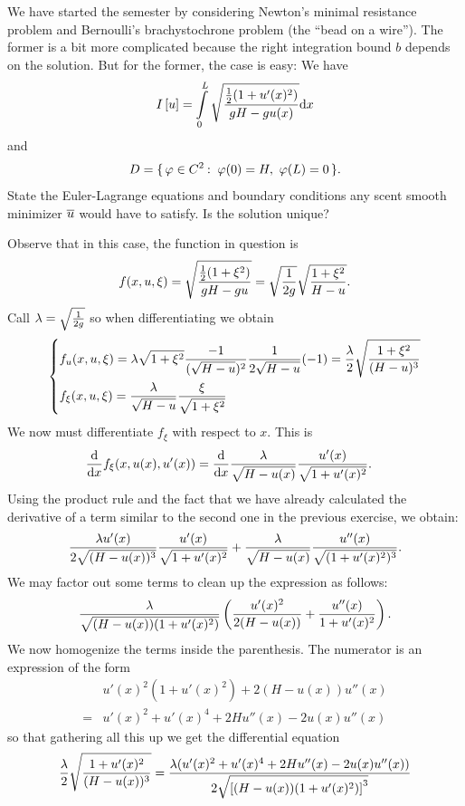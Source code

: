 \documentclass[12pt]{memoir}
\begin{document}
\begin{Ej}
    We have started the semester by considering Newton's
    minimal resistance problem and Bernoulli's brachystochrone problem (the ``bead on a wire''). The former is
    a bit more complicated because the right integration bound $ b$ depends on the solution. But for the former,
    the case is easy: We have
    $$I\bonj{u}=\int\limits_0^L\sqrt{\frac{\half(1+u'(x)^2)}{gH-gu(x)}}\dd x$$
    and
    $$D=\set{\vf\in C^2\:\ \vf(0)=H,\ \vf(L)=0}.$$
    State the Euler-Lagrange equations and boundary conditions any scent smooth minimizer $\overline u$ would
have to satisfy. Is the solution unique?
\end{Ej}

\begin{ptcbr}
Observe that in this case, the function in question is 
$$f(x,u,\xi)=\sqrt{\frac{\half(1+\xi^2)}{gH-gu}}=\sqrt{\frac{1}{2g}}\sqrt{\frac{1+\xi^2}{H-u}}.$$
Call $\lambda=\sqrt{\frac{1}{2g}}$ so when differentiating we obtain 
$$\left\lbrace
\begin{aligned}
    &f_u(x,u,\xi)=\lambda\sqrt{1+\xi^2}\frac{-1}{(\sqrt{H-u})^2}\frac{1}{2\sqrt{H-u}}(-1)=\frac{\lambda}{2}\sqrt{\frac{1+\xi^2}{(H-u)^3}}\\
    &f_\xi(x,u,\xi)=\frac{\lambda}{\sqrt{H-u}}\frac{\xi}{\sqrt{1+\xi^2}}
\end{aligned}
\right.
$$
We now must differentiate $f_\xi$ with respect to $x$. This is 
\begin{align*}
    \dv{x}f_{\xi}(x,u(x),u'(x))&=\dv{x}\frac{\lambda}{\sqrt{H-u(x)}}\frac{u'(x)}{\sqrt{1+u'(x)^2}}.
\end{align*}
Using the product rule and the fact that we have already calculated the derivative of a term similar to the second one in the previous exercise, we obtain:
$$\frac{\lambda u'(x)}{2\sqrt{(H-u(x))^3}}\frac{u'(x)}{\sqrt{1+u'(x)^2}}+\frac{\lambda}{\sqrt{H-u(x)}}\frac{u''(x)}{\sqrt{(1+u'(x)^2)^{3}}}.$$
We may factor out some terms to clean up the expression as follows:
$$\frac{\lambda}{\sqrt{(H-u(x))(1+u'(x)^2)}}\left(\frac{u'(x)^2}{2(H-u(x))}+\frac{u''(x)}{1+u'(x)^2}\right).$$
We now homogenize the terms inside the parenthesis. The numerator is an expression of the form 
\begin{align*}
&u'(x)^2(1+u'(x)^2)+2(H-u(x))u''(x)\\
=&u'(x)^2+u'(x)^4+2Hu''(x)-2u(x)u''(x)
\end{align*}
so that gathering all this up we get the differential equation
$$\frac{\lambda}{2}\sqrt{\frac{1+u'(x)^2}{(H-u(x))^3}}=\frac{\lambda(u'(x)^2+u'(x)^4+2Hu''(x)-2u(x)u''(x))}{2\sqrt{\left\lbrack(H-u(x))(1+u'(x)^2)\right\rbrack^3}}$$

\end{ptcbr}
\end{document}
